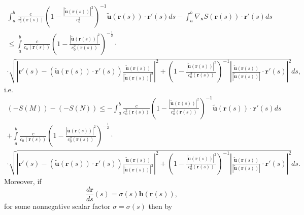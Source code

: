 \documentclass{article}
\theoremstyle{definition}
\theoremstyle{remark}
\renewcommand{\vec}[1]{\mathbf{#1}}
\begin{document}
\begin{multline}\label{MaxMedFullGGffgggyyojjhhjkhjyyiuhggjhhjhuyytytyuuytrrtghjtyuggyuighjuyioyyfgffhyuhhghzzrriuihhkkkhh}
\int_a^b\frac{c}{c^2_0\left(\vec
r(s)\right)}\left(1-\frac{\left|\vec {\tilde u}\left(\vec
r(s)\right)\right|^2}{c^2_0}\right)^{-1}\vec {\tilde u}\left(\vec
r(s)\right)\cdot\vec r'(s)ds-\int_a^b\nabla_{\vec x}S\left(\vec
r(s)\right)\cdot\vec r'(s)ds\\
\leq\int\limits_a^b\frac{c}{c_0\left(\vec
r(s)\right)}\left(1-\frac{\left|\vec {\tilde u}\left(\vec
r(s)\right)\right|^2}{c^2_0\left(\vec
r(s)\right)}\right)^{-\frac{1}{2}}
\cdot\\
\cdot\sqrt{\left|\vec r'(s)-\left(\vec {\tilde u}\left(\vec
r(s)\right)\cdot\vec r'(s)\right)\frac{\vec {\tilde u}\left(\vec
r(s)\right)}{\left|\vec {\tilde u}\left(\vec
r(s)\right)\right|^2}\right|^2+\left(1-\frac{\left|\vec {\tilde
u}\left(\vec r(s)\right)\right|^2}{c^2_0\left(\vec
r(s)\right)}\right)^{-1}\left|\frac{\vec {\tilde u}\left(\vec
r(s)\right)}{\left|\vec {\tilde u}\left(\vec
r(s)\right)\right|}\cdot\vec r'(s)\right|^2}ds,
\end{multline}
i.e.
\begin{multline}\label{MaxMedFullGGffgggyyojjhhjkhjyyiuhggjhhjhuyytytyuuytrrtghjtyuggyuighjuyioyyfgffhyuhhghzzrrkkijjhjhhkkkhh}
\left(-S(M)\right)-
\left(-S(N)\right)\leq-\int_a^b\frac{c}{c^2_0\left(\vec
r(s)\right)}\left(1-\frac{\left|\vec {\tilde u}\left(\vec
r(s)\right)\right|^2}{c^2_0\left(\vec r(s)\right)}\right)^{-1}\vec
{\tilde u}\left(\vec r(s)\right)\cdot\vec
r'(s)ds\\+\int\limits_a^b\frac{c}{c_0\left(\vec
r(s)\right)}\left(1-\frac{\left|\vec {\tilde u}\left(\vec
r(s)\right)\right|^2}{c^2_0\left(\vec
r(s)\right)}\right)^{-\frac{1}{2}}
\cdot\\
\cdot\sqrt{\left|\vec r'(s)-\left(\vec {\tilde u}\left(\vec
r(s)\right)\cdot\vec r'(s)\right)\frac{\vec {\tilde u}\left(\vec
r(s)\right)}{\left|\vec {\tilde u}\left(\vec
r(s)\right)\right|^2}\right|^2+\left(1-\frac{\left|\vec {\tilde
u}\left(\vec r(s)\right)\right|^2}{c^2_0\left(\vec
r(s)\right)}\right)^{-1}\left|\frac{\vec {\tilde u}\left(\vec
r(s)\right)}{\left|\vec {\tilde u}\left(\vec
r(s)\right)\right|}\cdot\vec r'(s)\right|^2}ds.
\end{multline}
Moreover, if
\begin{equation}\label{MaxMedFullGGffgggyyojjyugggjhhjzzrrhhkkkhh}
\frac{d\vec r}{ds}(s)=\sigma(s)\vec h\left(\vec r(s)\right),
\end{equation}
for some nonnegative scalar factor $\sigma=\sigma(s)$ then by
\end{document}
